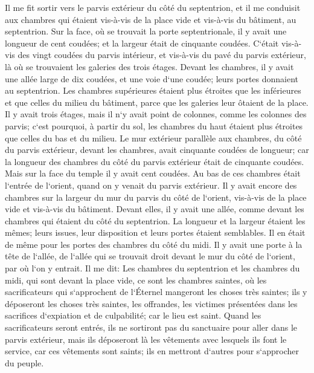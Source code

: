 \verse Il me fit sortir vers le parvis extérieur du côté du septentrion, et il me conduisit aux chambres qui étaient vis-à-vis de la place vide et vis-à-vis du bâtiment, au septentrion. 
\verse Sur la face, où se trouvait la porte septentrionale, il y avait une longueur de cent coudées; et la largeur était de cinquante coudées. 
\verse C`était vis-à-vis des vingt coudées du parvis intérieur, et vis-à-vis du pavé du parvis extérieur, là où se trouvaient les galeries des trois étages. 
\verse Devant les chambres, il y avait une allée large de dix coudées, et une voie d`une coudée; leurs portes donnaient au septentrion. 
\verse Les chambres supérieures étaient plus étroites que les inférieures et que celles du milieu du bâtiment, parce que les galeries leur ôtaient de la place. 
\verse Il y avait trois étages, mais il n`y avait point de colonnes, comme les colonnes des parvis; c`est pourquoi, à partir du sol, les chambres du haut étaient plus étroites que celles du bas et du milieu. 
\verse Le mur extérieur parallèle aux chambres, du côté du parvis extérieur, devant les chambres, avait cinquante coudées de longueur; 
\verse car la longueur des chambres du côté du parvis extérieur était de cinquante coudées. Mais sur la face du temple il y avait cent coudées. 
\verse Au bas de ces chambres était l`entrée de l`orient, quand on y venait du parvis extérieur. 
\verse Il y avait encore des chambres sur la largeur du mur du parvis du côté de l`orient, vis-à-vis de la place vide et vis-à-vis du bâtiment. 
\verse Devant elles, il y avait une allée, comme devant les chambres qui étaient du côté du septentrion. La longueur et la largeur étaient les mêmes; leurs issues, leur disposition et leurs portes étaient semblables. 
\verse Il en était de même pour les portes des chambres du côté du midi. Il y avait une porte à la tête de l`allée, de l`allée qui se trouvait droit devant le mur du côté de l`orient, par où l`on y entrait. 
\verse Il me dit: Les chambres du septentrion et les chambres du midi, qui sont devant la place vide, ce sont les chambres saintes, où les sacrificateurs qui s`approchent de l`Éternel mangeront les choses très saintes; ils y déposeront les choses très saintes, les offrandes, les victimes présentées dans les sacrifices d`expiation et de culpabilité; car le lieu est saint. 
\verse Quand les sacrificateurs seront entrés, ils ne sortiront pas du sanctuaire pour aller dans le parvis extérieur, mais ils déposeront là les vêtements avec lesquels ils font le service, car ces vêtements sont saints; ils en mettront d`autres pour s`approcher du peuple. 
